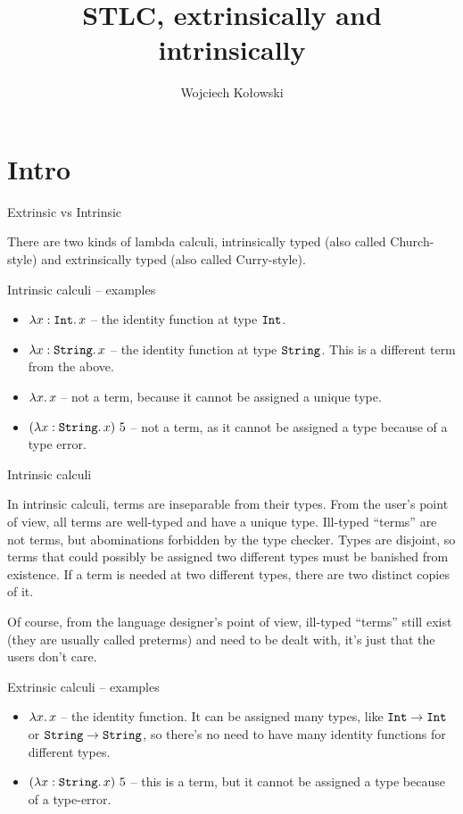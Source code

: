 \documentclass{beamer}
\title{STLC, extrinsically and intrinsically}
\author{Wojciech Kołowski}
\date{}
\begin{document}
\frame{\titlepage}

\section{Intro}

\begin{frame}{Extrinsic vs Intrinsic}

There are two kinds of lambda calculi, intrinsically typed (also called Church-style) and extrinsically typed (also called Curry-style).

\end{frame}

\begin{frame}{Intrinsic calculi -- examples}

\begin{itemize}
  \item $\fun{x}[\Int]{x}$ -- the identity function at type $\texttt{Int}$.
  \item $\fun{x}[\String]{x}$ -- the identity function at type $\texttt{String}$. This is a different term from the above.
  \item $\fun{x}{x}$ -- not a term, because it cannot be assigned a unique type.
  \item $\app{(\fun{x}[\String]{x})}{5}$ -- not a term, as it cannot be assigned a type because of a type error.
\end{itemize}

\end{frame}

\begin{frame}{Intrinsic calculi}

In intrinsic calculi, terms are inseparable from their types. From the user's point of view, all terms are well-typed and have a unique type. Ill-typed ``terms'' are not terms, but abominations forbidden by the type checker. Types are disjoint, so terms that could possibly be assigned two different types must be banished from existence. If a term is needed at two different types, there are two distinct copies of it.

\vspace{2em}

Of course, from the language designer's point of view, ill-typed ``terms'' still exist (they are usually called preterms) and need to be dealt with, it's just that the users don't care.

\end{frame}

\begin{frame}{Extrinsic calculi -- examples}

\begin{itemize}
  \item $\fun{x}{x}$ -- the identity function. It can be assigned many types, like $\texttt{Int} \to \texttt{Int}$ or $\texttt{String} \to \texttt{String}$, so there's no need to have many identity functions for different types.
  \item $\app{(\fun{x}[\String]{x})}{5}$ -- this is a term, but it cannot be assigned a type because of a type-error.
\end{itemize}

\end{frame}
\end{document}
